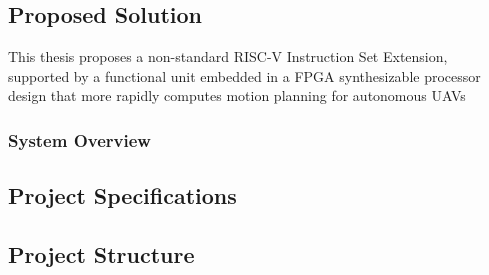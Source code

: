 
\subsection{Proposed Solution}
    This thesis proposes a non-standard RISC-V Instruction Set Extension, supported by a functional unit embedded in a \ac{FPGA} synthesizable processor design that more rapidly computes motion planning for autonomous \ac{UAV}s

    \subsubsection*{System Overview}
    


\subsection{Project Specifications}

\subsection{Project Structure}
\label{subsection:project_structure}
